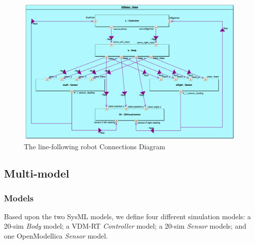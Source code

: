 \begin{figure}[htb!]
\begin{center}
     \includegraphics[width=0.9\linewidth]{linefollower/r2g2p_cd_rep_3d} 
\caption{The line-following robot Connections Diagram}
\label{fig:linefollowcdrep2}
\end{center}
\end{figure}


\subsection{Multi-model}
\label{sec:linefollwerrobot_into_mm}

\subsubsection{Models}
%

Based upon the two SysML models, we define four different simulation models: a 20-sim \emph{Body} model; a VDM-RT \emph{Controller} model; a 20-sim \emph{Sensor} models; and one OpenModellica \emph{Sensor} model.  

